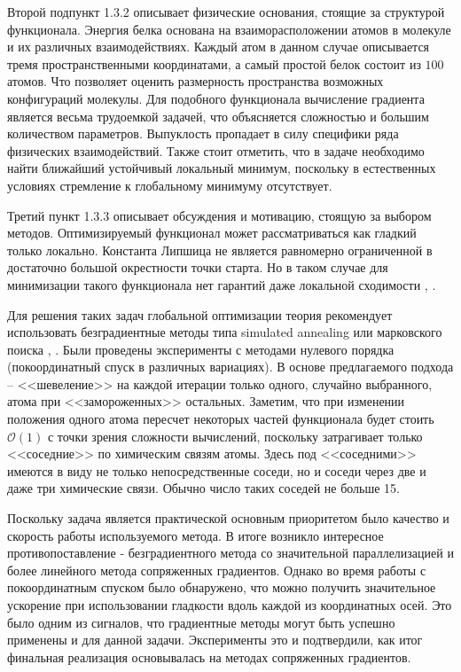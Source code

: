Второй подпункт 1.3.2 описывает физические основания, стоящие за структурой функционала. Энергия белка основана на взаиморасположении атомов в молекуле и их различных взаимодействиях. Каждый атом в данном случае описывается тремя пространственными координатами, а самый простой белок состоит из $100$ атомов. Что позволяет оценить размерность пространства возможных конфигураций молекулы. Для подобного функционала вычисление градиента является весьма трудоемкой задачей, что объясняется сложностью и большим количеством параметров. Выпуклость пропадает в силу специфики ряда физических взаимодействий. Также стоит отметить, что в задаче необходимо найти ближайший устойчивый локальный минимум, поскольку в естественных условиях стремление к глобальному минимуму отсутствует. 

Третий пункт 1.3.3 описывает обсуждения и мотивацию, стоящую за выбором методов. Оптимизируемый функционал может рассматриваться как гладкий только локально. Константа Липшица не является равномерно ограниченной в достаточно большой окрестности точки старта. Но в таком случае для минимизации такого функционала нет гарантий даже локальной сходимости \cite{ghadimi2015generalized}, \cite{nesterov2017random}.
   
Для решения таких задач глобальной оптимизации теория рекомендует использовать безградиентные методы типа simulated annealing или марковского поиска \cite{zhigljavsky2007stochastic}, \cite{zhigljavsky2012theory}.
Были проведены эксперименты с методами нулевого порядка (покоординатный спуск в различных вариациях). В основе предлагаемого подхода -- <<шевеление>> на каждой итерации только одного, случайно выбранного, атома при <<замороженных>> остальных. Заметим, что при изменении положения одного атома пересчет некоторых частей функционала будет стоить $\mathcal{O}\left( 1 \right)$ с точки зрения сложности вычислений, поскольку затрагивает только <<соседние>> по химическим связям атомы. Здесь под <<соседними>> имеются в виду не только непосредственные соседи, но и соседи через две и даже три химические связи. Обычно число таких соседей не больше 15. 

Поскольку задача является практической основным приоритетом было качество и скорость работы используемого метода. В итоге возникло интересное противопоставление - безградиентного метода со значительной параллелизацией и более линейного метода сопряженных градиентов. Однако во время работы с покоординатным спуском было обнаружено, что можно получить значительное ускорение при использовании гладкости вдоль каждой из координатных осей. Это было одним из сигналов, что градиентные методы могут быть успешно применены и для данной задачи. Эксперименты это и подтвердили, как итог финальная реализация основывалась на методах сопряженных градиентов.

